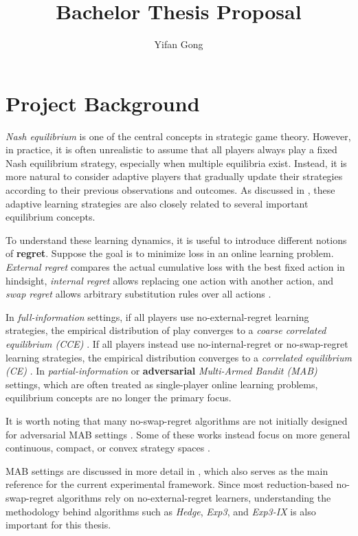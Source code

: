 \documentclass[12pt,a4paper]{article}
\title{Bachelor Thesis Proposal}
\author{Yifan Gong}
\begin{document}
\maketitle


\section{Project Background}
\emph{Nash equilibrium} is one of the central concepts in strategic game theory.
However, in practice, it is often unrealistic to assume that all players always play a fixed Nash equilibrium strategy, especially when multiple equilibria exist.
Instead, it is more natural to consider adaptive players that gradually update their strategies according to their previous observations and outcomes.
As discussed in \cite{foster1997calibrated}, these adaptive learning strategies are also closely related to several important equilibrium concepts.

To understand these learning dynamics, it is useful to introduce different notions of \textbf{regret}.
Suppose the goal is to minimize loss in an online learning problem.
\emph{External regret} compares the actual cumulative loss with the best fixed action in hindsight,
\emph{internal regret} allows replacing one action with another action,
and \emph{swap regret} allows arbitrary substitution rules over all actions \cite{blum2005internal}.

In \emph{full-information} settings, if all players use no-external-regret learning strategies, the empirical distribution of play converges to a \emph{coarse correlated equilibrium (CCE)} \cite{foster1997calibrated}.
If all players instead use no-internal-regret or no-swap-regret learning strategies, the empirical distribution converges to a \emph{correlated equilibrium (CE)} \cite{blum2005internal, hart2000regret}.
In \emph{partial-information} or \textbf{adversarial} \emph{Multi-Armed Bandit (MAB)} settings, which are often treated as single-player online learning problems, equilibrium concepts are no longer the primary focus.

It is worth noting that many no-swap-regret algorithms are not initially designed for adversarial MAB settings \cite{hart2000regret, stoltz2005internal, stoltz2007correlated, gordon2008convex}.
Some of these works instead focus on more general continuous, compact, or convex strategy spaces \cite{stoltz2005internal, stoltz2007correlated, gordon2008convex}.

MAB settings are discussed in more detail in \cite{lattimore2020bandit}, which also serves as the main reference for the current experimental framework.
Since most reduction-based no-swap-regret algorithms rely on no-external-regret learners, understanding the methodology behind algorithms such as \emph{Hedge}, \emph{Exp3}, and \emph{Exp3-IX} is also important for this thesis.
\end{document}
